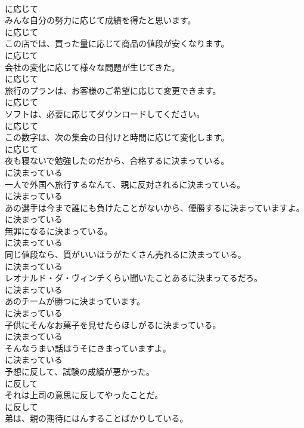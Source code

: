 \documentclass[8pt]{extreport}
\begin{document}
\begin{CJK}{UTF8}{min}
\\	に応じて
\\	みんな自分の努力に応じて成績を得たと思います。	
\\	に応じて
\\	この店では、買った量に応じて商品の値段が安くなります。	
\\	に応じて
\\	会社の変化に応じて様々な問題が生じてきた。	
\\	に応じて
\\	旅行のプランは、お客様のご希望に応じて変更できます。	
\\	に応じて
\\	ソフトは、必要に応じてダウンロードしてください。	
\\	に応じて
\\	この数字は、次の集会の日付けと時間に応じて変化します。	
\\	に応じて
\\	夜も寝ないで勉強したのだから、合格するに決まっている。	
\\	に決まっている
\\	一人で外国へ旅行するなんて、親に反対されるに決まっている。	
\\	に決まっている
\\	あの選手は今まで誰にも負けたことがないから、優勝するに決まっていますよ。	
\\	に決まっている
\\	無罪になるに決まっている。	
\\	に決まっている
\\	同じ値段なら、質がいいほうがたくさん売れるに決まっている。	
\\	に決まっている
\\	レオナルド・ダ・ヴィンチくらい聞いたことあるに決まってるだろ。	
\\	に決まっている
\\	あのチームが勝つに決まっています。	
\\	に決まっている
\\	子供にそんなお菓子を見せたらほしがるに決まっている。	
\\	に決まっている
\\	そんなうまい話はうそにきまっていますよ。	
\\	に決まっている
\\	予想に反して、試験の成績が悪かった。	
\\	に反して
\\	それは上司の意思に反してやったことだ。	
\\	に反して
\\	弟は、親の期待にはんすることばかりしている。	

\end{CJK}
\end{document}
